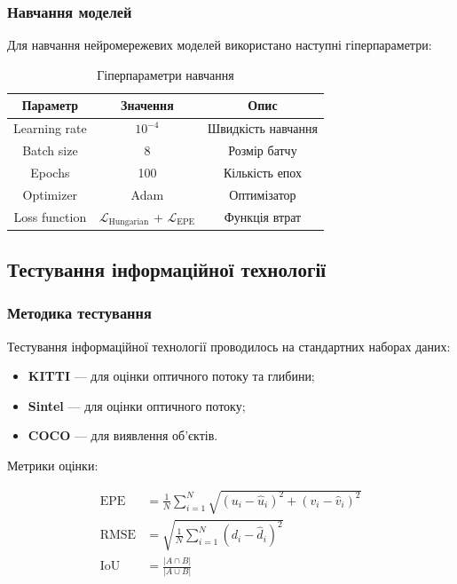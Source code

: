 \documentclass[14pt, a4paper]{extarticle}
\numberwithin{equation}{section}
\begin{document}
\subsubsection{Навчання моделей}

Для навчання нейромережевих моделей використано наступні гіперпараметри:

\begin{table}[H]
\centering
\caption{Гіперпараметри навчання}
\begin{tabular}{|c|c|c|}
\hline
\textbf{Параметр} & \textbf{Значення} & \textbf{Опис} \\
\hline
Learning rate & $10^{-4}$ & Швидкість навчання \\
Batch size & 8 & Розмір батчу \\
Epochs & 100 & Кількість епох \\
Optimizer & Adam & Оптимізатор \\
Loss function & $\mathcal{L}_{\text{Hungarian}}$ + $\mathcal{L}_{\text{EPE}}$ & Функція втрат \\
\hline
\end{tabular}
\label{tab:hyperparams}
\end{table}

\subsection{Тестування інформаційної технології}

\subsubsection{Методика тестування}

Тестування інформаційної технології проводилось на стандартних наборах даних:

\begin{itemize}
\item \textbf{KITTI} — для оцінки оптичного потоку та глибини;
\item \textbf{Sintel} — для оцінки оптичного потоку;
\item \textbf{COCO} — для виявлення об'єктів.
\end{itemize}

Метрики оцінки:

\begin{align}
\text{EPE} &= \frac{1}{N} \sum_{i=1}^N \sqrt{(u_i - \hat{u}_i)^2 + (v_i - \hat{v}_i)^2} \tag{4.29} \\
\text{RMSE} &= \sqrt{\frac{1}{N} \sum_{i=1}^N (d_i - \hat{d}_i)^2} \tag{4.30} \\
\text{IoU} &= \frac{|A \cap B|}{|A \cup B|} \tag{4.31}
\end{align}
\end{document}
